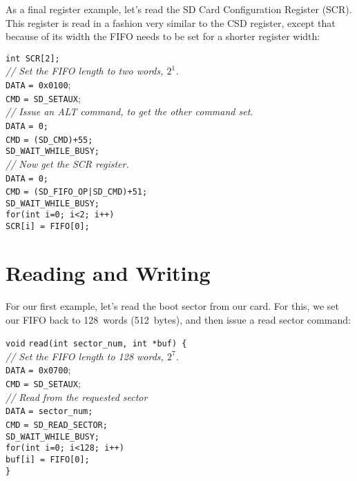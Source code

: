 \documentclass{gqtekspec}
\begin{document}
As a final register example, let's read the SD Card Configuration Register
(SCR).  This register is read in a fashion very similar to the CSD register,
except that because of its width the FIFO needs to be set for a shorter
register width:
\begin{tabbing}
{\tt int SCR[2];}\\
{\em // Set the FIFO length to two words, $2^1$.}\\
{\tt DATA} \= {\tt = 0x0100}; \\
{\tt CMD} \> {\tt = SD\_SETAUX};\\
{\em // Issue an ALT command, to get the other command set.}\\
{\tt DATA} \= {\tt = 0;} \\
{\tt CMD} \> {\tt = (SD\_CMD)+55;}\\
{\tt SD\_WAIT\_WHILE\_BUSY;} \\
{\em // Now get the SCR register.}\\
{\tt DATA} \= {\tt = 0;} \\
{\tt CMD} \> {\tt = (SD\_FIFO\_OP|SD\_CMD)+51;}\\
{\tt SD\_WAIT\_WHILE\_BUSY;} \\
{\tt for(int i=0; i<2; i++) } \\
\> {\tt SCR[i] = FIFO[0];}\\
\end{tabbing}


\section{Reading and Writing}

For our first example, let's read the boot sector from our card.  For this,
we set our FIFO back to 128~words (512~bytes), and then issue a read sector
command:
\begin{tabbing}
{\tt void} \= {\tt read(int sector\_num, int *buf) \{}\\
\> {\em // Set the FIFO length to 128 words, $2^7$.}\\
\> {\tt DATA} \= {\tt = 0x0700}; \\
\> {\tt CMD} \> {\tt = SD\_SETAUX};\\
\> {\em // Read from the requested sector}\\
\> {\tt DATA} \= {\tt = sector\_num;} \\
\> {\tt CMD} \> {\tt = SD\_READ\_SECTOR;}\\
\> {\tt SD\_WAIT\_WHILE\_BUSY;} \\
\> {\tt for(int i=0; i<128; i++) } \\
\> \> {\tt buf[i] = FIFO[0];}\\
{\tt \}}
\end{tabbing}
\end{document}
